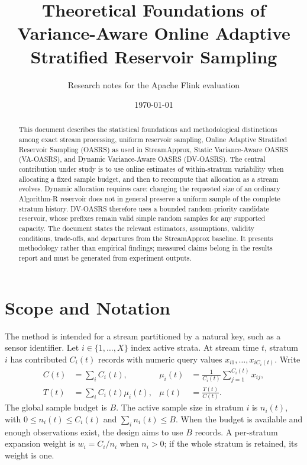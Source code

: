 \documentclass[11pt]{article}
\title{Theoretical Foundations of Variance-Aware Online Adaptive Stratified Reservoir Sampling}
\author{Research notes for the Apache Flink evaluation}
\date{\today}
\begin{document}
\maketitle

\begin{abstract}
This document describes the statistical foundations and methodological distinctions among exact stream processing, uniform reservoir sampling, Online Adaptive Stratified Reservoir Sampling (OASRS) as used in StreamApprox, Static Variance-Aware OASRS (VA-OASRS), and Dynamic Variance-Aware OASRS (DV-OASRS). The central contribution under study is to use online estimates of within-stratum variability when allocating a fixed sample budget, and then to recompute that allocation as a stream evolves. Dynamic allocation requires care: changing the requested size of an ordinary Algorithm-R reservoir does not in general preserve a uniform sample of the complete stratum history. DV-OASRS therefore uses a bounded random-priority candidate reservoir, whose prefixes remain valid simple random samples for any supported capacity. The document states the relevant estimators, assumptions, validity conditions, trade-offs, and departures from the StreamApprox baseline. It presents methodology rather than empirical findings; measured claims belong in the results report and must be generated from experiment outputs.
\end{abstract}

\tableofcontents

\section{Scope and Notation}

The method is intended for a stream partitioned by a natural key, such as a sensor identifier. Let $i\in\{1,\ldots,X\}$ index active strata. At stream time $t$, stratum $i$ has contributed $C_i(t)$ records with numeric query values $x_{i1},\ldots,x_{iC_i(t)}$. Write
\begin{align}
 C(t) &= \sum_i C_i(t), &
 \mu_i(t) &= \frac{1}{C_i(t)}\sum_{j=1}^{C_i(t)}x_{ij},\\
 T(t) &= \sum_i C_i(t)\mu_i(t), &
 \mu(t) &= \frac{T(t)}{C(t)}.
\end{align}
The global sample budget is $B$. The active sample size in stratum $i$ is $n_i(t)$, with $0\le n_i(t)\le C_i(t)$ and $\sum_i n_i(t)\le B$. When the budget is available and enough observations exist, the design aims to use $B$ records. A per-stratum expansion weight is $w_i=C_i/n_i$ when $n_i>0$; if the whole stratum is retained, its weight is one.
\end{document}

